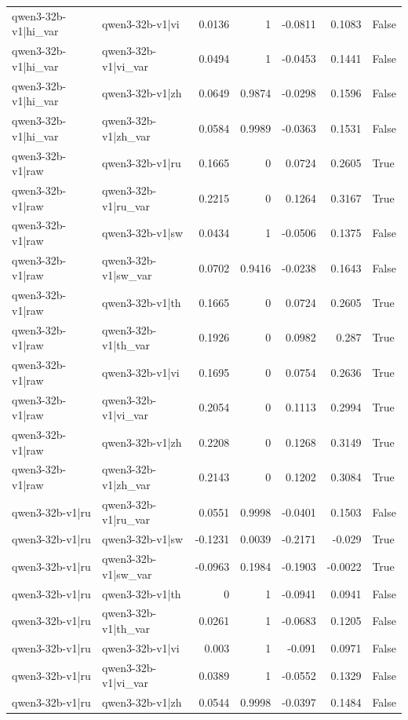 \begin{table}
\begin{tabular}{l l r r r r l}
qwen3-32b-v1|hi_var & qwen3-32b-v1|vi & 0.0136 & 1 & -0.0811 & 0.1083 & False \\
qwen3-32b-v1|hi_var & qwen3-32b-v1|vi_var & 0.0494 & 1 & -0.0453 & 0.1441 & False \\
qwen3-32b-v1|hi_var & qwen3-32b-v1|zh & 0.0649 & 0.9874 & -0.0298 & 0.1596 & False \\
qwen3-32b-v1|hi_var & qwen3-32b-v1|zh_var & 0.0584 & 0.9989 & -0.0363 & 0.1531 & False \\
qwen3-32b-v1|raw & qwen3-32b-v1|ru & 0.1665 & 0 & 0.0724 & 0.2605 & True \\
qwen3-32b-v1|raw & qwen3-32b-v1|ru_var & 0.2215 & 0 & 0.1264 & 0.3167 & True \\
qwen3-32b-v1|raw & qwen3-32b-v1|sw & 0.0434 & 1 & -0.0506 & 0.1375 & False \\
qwen3-32b-v1|raw & qwen3-32b-v1|sw_var & 0.0702 & 0.9416 & -0.0238 & 0.1643 & False \\
qwen3-32b-v1|raw & qwen3-32b-v1|th & 0.1665 & 0 & 0.0724 & 0.2605 & True \\
qwen3-32b-v1|raw & qwen3-32b-v1|th_var & 0.1926 & 0 & 0.0982 & 0.287 & True \\
qwen3-32b-v1|raw & qwen3-32b-v1|vi & 0.1695 & 0 & 0.0754 & 0.2636 & True \\
qwen3-32b-v1|raw & qwen3-32b-v1|vi_var & 0.2054 & 0 & 0.1113 & 0.2994 & True \\
qwen3-32b-v1|raw & qwen3-32b-v1|zh & 0.2208 & 0 & 0.1268 & 0.3149 & True \\
qwen3-32b-v1|raw & qwen3-32b-v1|zh_var & 0.2143 & 0 & 0.1202 & 0.3084 & True \\
qwen3-32b-v1|ru & qwen3-32b-v1|ru_var & 0.0551 & 0.9998 & -0.0401 & 0.1503 & False \\
qwen3-32b-v1|ru & qwen3-32b-v1|sw & -0.1231 & 0.0039 & -0.2171 & -0.029 & True \\
qwen3-32b-v1|ru & qwen3-32b-v1|sw_var & -0.0963 & 0.1984 & -0.1903 & -0.0022 & True \\
qwen3-32b-v1|ru & qwen3-32b-v1|th & 0 & 1 & -0.0941 & 0.0941 & False \\
qwen3-32b-v1|ru & qwen3-32b-v1|th_var & 0.0261 & 1 & -0.0683 & 0.1205 & False \\
qwen3-32b-v1|ru & qwen3-32b-v1|vi & 0.003 & 1 & -0.091 & 0.0971 & False \\
qwen3-32b-v1|ru & qwen3-32b-v1|vi_var & 0.0389 & 1 & -0.0552 & 0.1329 & False \\
qwen3-32b-v1|ru & qwen3-32b-v1|zh & 0.0544 & 0.9998 & -0.0397 & 0.1484 & False \\

\end{tabular}
\end{table}

